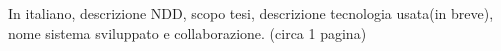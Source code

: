 In italiano, descrizione NDD, scopo tesi, descrizione tecnologia usata(in breve), nome sistema sviluppato e collaborazione. (circa 1 pagina)